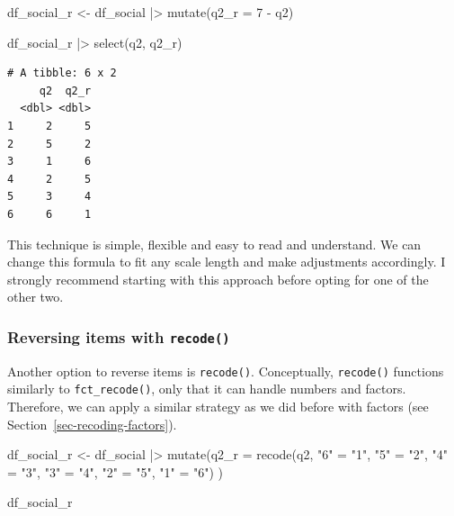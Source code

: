 \documentclass[
  letterpaper,
  DIV=11,
  numbers=noendperiod]{scrreprt}
\newenvironment{Shaded}{\begin{snugshade}}{\end{snugshade}}
\newcommand{\AttributeTok}[1]{\textcolor[rgb]{0.40,0.45,0.13}{#1}}
\newcommand{\DecValTok}[1]{\textcolor[rgb]{0.68,0.00,0.00}{#1}}
\newcommand{\FunctionTok}[1]{\textcolor[rgb]{0.28,0.35,0.67}{#1}}
\newcommand{\NormalTok}[1]{\textcolor[rgb]{0.00,0.23,0.31}{#1}}
\newcommand{\OtherTok}[1]{\textcolor[rgb]{0.00,0.23,0.31}{#1}}
\newcommand{\SpecialCharTok}[1]{\textcolor[rgb]{0.37,0.37,0.37}{#1}}
\newcommand{\StringTok}[1]{\textcolor[rgb]{0.13,0.47,0.30}{#1}}
\begin{document}
\begin{Shaded}
\begin{Highlighting}[]
\NormalTok{df\_social\_r }\OtherTok{\textless{}{-}}
\NormalTok{  df\_social }\SpecialCharTok{|\textgreater{}}
  \FunctionTok{mutate}\NormalTok{(}\AttributeTok{q2\_r =} \DecValTok{7} \SpecialCharTok{{-}}\NormalTok{ q2)}

\NormalTok{df\_social\_r }\SpecialCharTok{|\textgreater{}}
  \FunctionTok{select}\NormalTok{(q2, q2\_r)}
\end{Highlighting}
\end{Shaded}

\begin{verbatim}
# A tibble: 6 x 2
     q2  q2_r
  <dbl> <dbl>
1     2     5
2     5     2
3     1     6
4     2     5
5     3     4
6     6     1
\end{verbatim}

This technique is simple, flexible and easy to read and understand. We
can change this formula to fit any scale length and make adjustments
accordingly. I strongly recommend starting with this approach before
opting for one of the other two.

\subsubsection{\texorpdfstring{Reversing items with
\texttt{recode()}}{Reversing items with recode()}}\label{sec-reversing-items-recode}

Another option to reverse items is \texttt{recode()}. Conceptually,
\texttt{recode()} functions similarly to \texttt{fct\_recode()}, only
that it can handle numbers and factors. Therefore, we can apply a
similar strategy as we did before with factors (see
Section~\ref{sec-recoding-factors}).

\begin{Shaded}
\begin{Highlighting}[]
\NormalTok{df\_social\_r }\OtherTok{\textless{}{-}}
\NormalTok{  df\_social }\SpecialCharTok{|\textgreater{}}
  \FunctionTok{mutate}\NormalTok{(}\AttributeTok{q2\_r =} \FunctionTok{recode}\NormalTok{(q2,}
                       \StringTok{"6"} \OtherTok{=} \StringTok{"1"}\NormalTok{,}
                       \StringTok{"5"} \OtherTok{=} \StringTok{"2"}\NormalTok{,}
                       \StringTok{"4"} \OtherTok{=} \StringTok{"3"}\NormalTok{,}
                       \StringTok{"3"} \OtherTok{=} \StringTok{"4"}\NormalTok{,}
                       \StringTok{"2"} \OtherTok{=} \StringTok{"5"}\NormalTok{,}
                       \StringTok{"1"} \OtherTok{=} \StringTok{"6"}\NormalTok{)}
\NormalTok{         )}

\NormalTok{df\_social\_r}
\end{Highlighting}
\end{Shaded}
\end{document}
